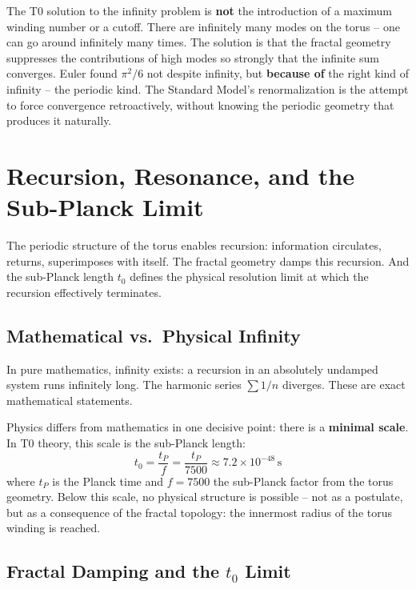 	\begin{keypoint}
		The T0 solution to the infinity problem is \textbf{not} the introduction of a maximum winding number or a cutoff. There are infinitely many modes on the torus -- one can go around infinitely many times. The solution is that the fractal geometry suppresses the contributions of high modes so strongly that the infinite sum converges. Euler found $\pi^2/6$ not despite infinity, but \textbf{because of} the right kind of infinity -- the periodic kind. The Standard Model's renormalization is the attempt to force convergence retroactively, without knowing the periodic geometry that produces it naturally.
	\end{keypoint}
	
	
	\section{Recursion, Resonance, and the Sub-Planck Limit}
	
	The periodic structure of the torus enables recursion: information circulates, returns, superimposes with itself. The fractal geometry damps this recursion. And the sub-Planck length $t_0$ defines the physical resolution limit at which the recursion effectively terminates.
	
	\subsection{Mathematical vs.\ Physical Infinity}
	
	In pure mathematics, infinity exists: a recursion in an absolutely undamped system runs infinitely long. The harmonic series $\sum 1/n$ diverges. These are exact mathematical statements.
	
	Physics differs from mathematics in one decisive point: there is a \textbf{minimal scale}. In T0 theory, this scale is the sub-Planck length:
	\begin{equation}
		t_0 = \frac{t_P}{f} = \frac{t_P}{7500} \approx 7.2 \times 10^{-48} \, \text{s}
	\end{equation}
	where $t_P$ is the Planck time and $f = 7500$ the sub-Planck factor from the torus geometry. Below this scale, no physical structure is possible -- not as a postulate, but as a consequence of the fractal topology: the innermost radius of the torus winding is reached.
	
	\subsection{Fractal Damping and the $t_0$ Limit}
	
